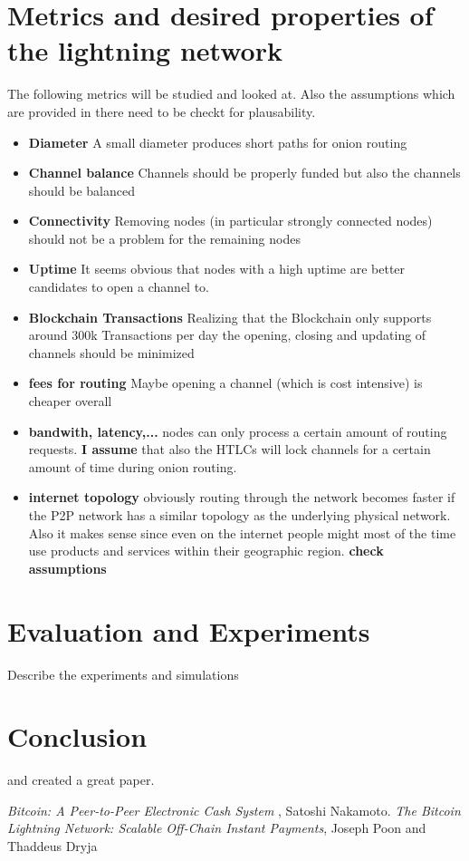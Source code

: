 \documentclass{article}
\begin{document}
\section{Metrics and desired properties of the lightning network}
The following metrics will be studied and looked at. Also the assumptions which are provided in there need to be checkt for plausability. 

\begin{itemize}
\item \textbf{Diameter} A small diameter produces short paths for onion routing 
\item \textbf{Channel balance} Channels should be properly funded but also the channels should be balanced  
\item \textbf{Connectivity} Removing nodes (in particular strongly connected nodes) should not be a problem for the remaining nodes
\item \textbf{Uptime} It seems obvious that nodes with a high uptime are better candidates to open a channel to. 
\item \textbf{Blockchain Transactions} Realizing that the Blockchain only supports around 300k Transactions per day the opening, closing and updating of channels should be minimized  
\item \textbf{fees for routing} Maybe opening a channel (which is cost intensive) is cheaper overall
\item \textbf{bandwith, latency,...} nodes can only process a certain amount of routing requests. \textbf{I assume} that also the HTLCs will lock channels for a certain amount of time during onion routing. 
\item \textbf{internet topology} obviously routing through the network becomes faster if the P2P network has a similar topology as the underlying physical network. Also it makes sense since even on the internet people might most of the time use products and services within their geographic region. \textbf{check assumptions}
\end{itemize}

\section{Evaluation and Experiments}
Describe the experiments and simulations


\section{Conclusion}
\cite{nak} and \cite{poon} created a great paper.


\begin{thebibliography}{9}
 \emph{Bitcoin: A Peer-to-Peer Electronic Cash System },
Satoshi Nakamoto.  
 \emph{The Bitcoin Lightning Network:
Scalable Off-Chain Instant Payments},
Joseph Poon and Thaddeus Dryja


\end{thebibliography}
\end{document}
